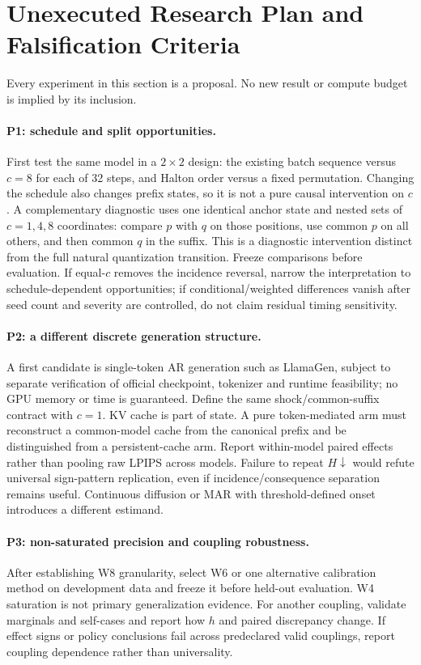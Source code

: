 \documentclass[11pt,a4paper]{article}
\theoremstyle{plain}
\theoremstyle{definition}
\theoremstyle{remark}
\begin{document}
\section{Unexecuted Research Plan and Falsification Criteria}
\label{sec:future}
Every experiment in this section is a proposal. No new result or compute budget
is implied by its inclusion.

\paragraph{P1: schedule and split opportunities.}
First test the same model in a $2\times2$ design: the existing batch sequence
versus $c=8$ for each of 32 steps, and Halton order versus a fixed permutation.
Changing the schedule also changes prefix states, so it is not a pure causal
intervention on $c$. A complementary diagnostic uses one identical anchor
state and nested sets of $c=1,4,8$ coordinates: compare $p$ with $q$ on those
positions, use common $p$ on all others, and then common $q$ in the suffix.
This is a diagnostic intervention distinct from the full natural quantization
transition. Freeze comparisons before evaluation. If equal-$c$ removes the
incidence reversal, narrow the interpretation to schedule-dependent opportunities;
if conditional/weighted differences vanish after seed count and severity are
controlled, do not claim residual timing sensitivity.

\paragraph{P2: a different discrete generation structure.}
A first candidate is single-token AR generation such as LlamaGen, subject to
separate verification of official checkpoint, tokenizer and runtime feasibility;
no GPU memory or time is guaranteed. Define the same shock/common-suffix contract
with $c=1$. KV cache is part of state. A pure token-mediated arm must reconstruct
a common-model cache from the canonical prefix and be distinguished from a
persistent-cache arm. Report within-model paired effects rather than pooling
raw LPIPS across models. Failure to repeat $H\downarrow$ would refute universal
sign-pattern replication, even if incidence/consequence separation remains
useful. Continuous diffusion or MAR with threshold-defined onset introduces a
different estimand.

\paragraph{P3: non-saturated precision and coupling robustness.}
After establishing W8 granularity, select W6 or one alternative calibration
method on development data and freeze it before held-out evaluation. W4
saturation is not primary generalization evidence. For another coupling,
validate marginals and self-cases and report how $h$ and paired discrepancy
change. If effect signs or policy conclusions fail across predeclared valid
couplings, report coupling dependence rather than universality.
\end{document}
